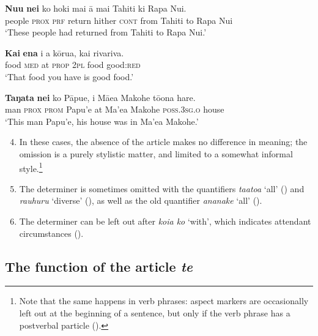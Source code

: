 \ea\label{ex:5.23}
\gll \textbf{Nu{\ꞌ}u} \textbf{nei} ko hoki mai {\ꞌ}ā mai Tahiti ki Rapa Nui.  \\
people \textsc{prox} \textsc{prf} return hither \textsc{cont} from Tahiti to Rapa Nui  \\

\glt 
‘These people had returned from Tahiti to Rapa Nui.’ \textstyleExampleref{[R231.086]} 
\z

\ea\label{ex:5.24}
\gll \textbf{Kai} \textbf{ena} i a kōrua, kai rivariva. \\
food \textsc{med} at \textsc{prop} \textsc{2pl} food good:\textsc{red} \\

\glt 
‘That food you have is good food.’ \textstyleExampleref{[R310.262]} 
\z

\ea\label{ex:5.25}
\gll \textbf{Taŋata} \textbf{nei} ko Pāpu{\ꞌ}e, {\ꞌ}i Mā{\ꞌ}ea Makohe tō{\ꞌ}ona hare. \\
man \textsc{prox} \textsc{prom} Papu’e at Ma’ea Makohe \textsc{poss.3sg.o} house \\

\glt
‘This man Papu’e, his house was in Ma’ea Makohe.’ \textstyleExampleref{[R372.035]} 
\z

\begin{enumerate}
\setcounter{enumi}{3}
\item[]
In these cases, the absence of the article makes no difference in meaning; the omission is a purely stylistic matter, and limited to a somewhat informal style.\footnote{\label{fn:248}Note that the same happens in verb phrases: aspect markers are occasionally left out at the beginning of a sentence, but only if the verb phrase has a postverbal particle ().}

\item
The determiner is sometimes omitted with the quantifiers \textit{\mbox{ta{\ꞌ}ato{\ꞌ}a}} ‘all’ () and \textit{rauhuru} ‘diverse’ (), as well as the old quantifier \textit{ana\-nake} ‘all’ ().

\item 
The determiner can be left out after \textit{koia ko} ‘with’, which indicates attendant circumstances ().
\end{enumerate}

\subsection{The function of the article \textit{te}}\label{sec:5.3.3}

